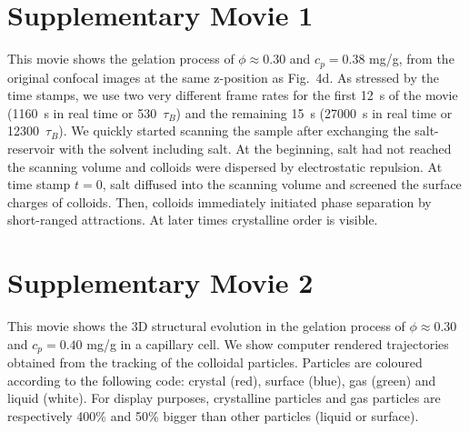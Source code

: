 


\clearpage

\section*{Supplementary Movie 1}
This movie shows the gelation process of $\phi\approx 0.30$ and $c_p=0.38$ mg/g, from the original confocal images at the same z-position as Fig.~4d. As stressed by the time stamps, we use two very different frame rates for the first 12~s of the movie (1160~s in real time or 530~$\tau_B$) and the remaining 15~s (27000~s in real time or 12300~$\tau_B$). We quickly started scanning the sample after exchanging the salt-reservoir with the solvent including salt. At the beginning, salt had not reached the scanning volume and colloids were dispersed by electrostatic repulsion. At time stamp $t=0$, salt diffused into the scanning volume and screened the surface charges of colloids. Then, colloids immediately initiated phase separation by short-ranged attractions. At later times crystalline order is visible.

\section*{Supplementary Movie 2}
This movie shows the 3D structural evolution in the gelation process of $\phi\approx 0.30$ and $c_p=0.40$ mg/g in a capillary cell. 
We show computer rendered trajectories obtained from the tracking of the colloidal particles. Particles are coloured according to the following code: crystal (red), surface (blue), gas (green) and liquid (white). For display purposes, crystalline particles and gas particles are respectively 400\% and 50\% bigger than other particles (liquid or surface).


